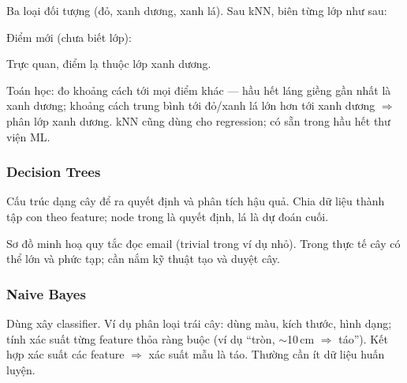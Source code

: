 \begin{vidu}[title={Phân loại đối tượng lạ bằng kNN}]

Ba loại đối tượng (đỏ, xanh dương, xanh lá). Sau kNN, biên từng lớp như sau:


Điểm mới (chưa biết lớp):


Trực quan, điểm lạ thuộc lớp xanh dương.

Toán học: đo khoảng cách tới mọi điểm khác --- hầu hết láng giềng gần nhất là xanh dương; khoảng cách trung bình tới đỏ/xanh lá lớn hơn tới xanh dương $\Rightarrow$ phân lớp xanh dương.
kNN cũng dùng cho regression; có sẵn trong hầu hết thư viện ML.
\end{vidu}

\subsubsection{Decision Trees}

\begin{ynghia}[title={Cây quyết định}]
Cấu trúc dạng cây để ra quyết định và phân tích hậu quả.
Chia dữ liệu thành tập con theo feature; node trong là quyết định, lá là dự đoán cuối.
\end{ynghia}

\begin{vidu}[title={Ví dụ cây quyết định đơn giản (email)}]
Sơ đồ minh hoạ quy tắc đọc email (trivial trong ví dụ nhỏ).
Trong thực tế cây có thể lớn và phức tạp; cần nắm kỹ thuật tạo và duyệt cây.
\end{vidu}

\subsubsection{Naive Bayes}

\begin{ynghia}[title={Naive Bayes}]
Dùng xây classifier.
Ví dụ phân loại trái cây: dùng màu, kích thước, hình dạng; tính xác suất từng feature thỏa ràng buộc (ví dụ ``tròn, $\sim$10\,cm $\Rightarrow$ táo'').
Kết hợp xác suất các feature $\Rightarrow$ xác suất mẫu là táo.
Thường cần ít dữ liệu huấn luyện.
\end{ynghia}

